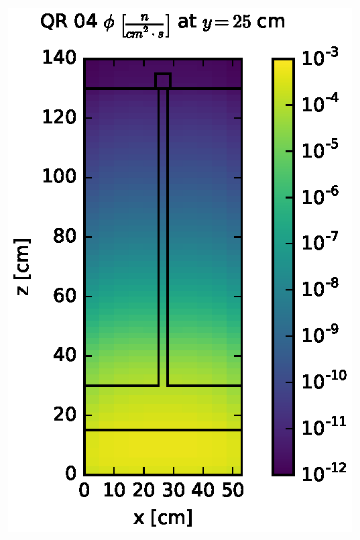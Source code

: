 \begin{figure}[!htb]
\centering
\begin{subfigure}{0.4\textwidth}
\includegraphics[max height=0.445\textheight]
{img/steel-plots/fwd/flux-qr04-slice.eps}
\end{subfigure} ~
\begin{subfigure}{0.4\textwidth}

\end{subfigure}
\end{figure}
